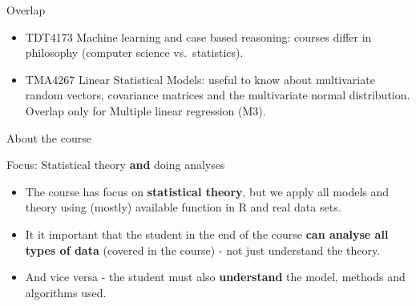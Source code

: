 \documentclass[10pt,ignorenonframetext,]{beamer}
\begin{document}
\begin{frame}

\begin{block}{Overlap}

\begin{itemize}
\item
  TDT4173 Machine learning and case based reasoning: courses differ in
  philosophy (computer science vs.~statistics).
\item
  TMA4267 Linear Statistical Models: useful to know about multivariate
  random vectors, covariance matrices and the multivariate normal
  distribution. Overlap only for Multiple linear regression (M3).
\end{itemize}

\end{block}

\end{frame}

\begin{frame}{About the course}

\begin{block}{Focus: Statistical theory \textbf{and} doing analyses}

\begin{itemize}
\item
  The course has focus on \textbf{statistical theory}, but we apply all
  models and theory using (mostly) available function in R and real data
  sets.
\item
  It it important that the student in the end of the course \textbf{can
  analyse all types of data} (covered in the course) - not just
  understand the theory.
\item
  And vice versa - the student must also \textbf{understand} the model,
  methods and algorithms used.
\end{itemize}

\end{block}

\end{frame}
\end{document}
